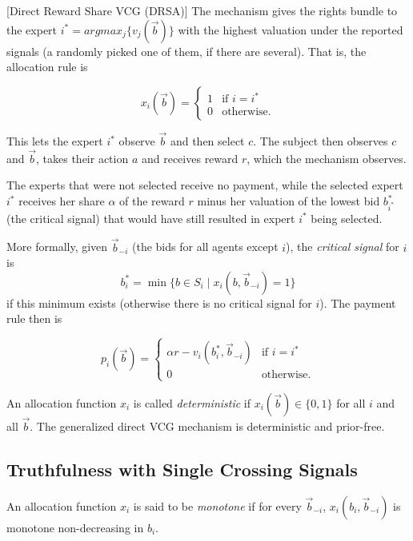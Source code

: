 \begin{mech}\label{mech:Direct}[Direct Reward Share VCG (DRSA)]
   The mechanism gives the rights bundle to the expert $i^*=argmax_j \{v_j(\vec b)\} $ with the highest valuation under the reported signals (a randomly picked one of them, if there are several).
   That is, the allocation rule is

   $$x_i(\vec{b}) = \begin{cases} 1 & \text{if } i = i^* \\ 0 & \text{otherwise.} \end{cases}$$

This lets the expert $i^*$ observe  $\vec{b}$ and then select $c$.
The subject then observes $c$ and $\vec{b}$, takes their action $a$ and receives reward $r$, which the mechanism observes. 

   The experts that were not selected receive no payment, while the selected expert $i^*$ receives her share $\alpha$ of the reward $r$ minus her valuation of the lowest bid $b_{i^*}^*$ (the critical signal) that would have still resulted in expert $i^*$ being selected.

More formally, given $\vec{b}_{-i}$ (the bids for all agents except $i$), the {\sl critical signal} for $i$ is
$$b_i^* = \min\{b\in S_i\mid x_i(b,\vec b_{-i})=1\}$$
if this minimum exists (otherwise there is no critical signal for $i$).
The payment rule then is

   $$p_i(\vec b)= \begin{cases}  \alpha r - v_i(b_i^*,\vec{b}_{-i})& \text{if }i = i^* \\ 0 & \text{otherwise.} \end{cases}$$

\end{mech}

An allocation function $x_i$ is called {\sl deterministic} if $x_i(\vec{b})\in \{0,1\}$ for all $i$ and all $\vec{b}$.
The generalized direct VCG mechanism is deterministic and prior-free.

\subsection{Truthfulness with Single Crossing Signals}
\begin{defn}[Monotonicity]
	An allocation function $x_i$ is said to be \emph{monotone} if for every $\vec{b}_{-i}$, $x_i(b_i,\vec{b}_{-i})$ is monotone non-decreasing in $b_i$.
\end{defn}

